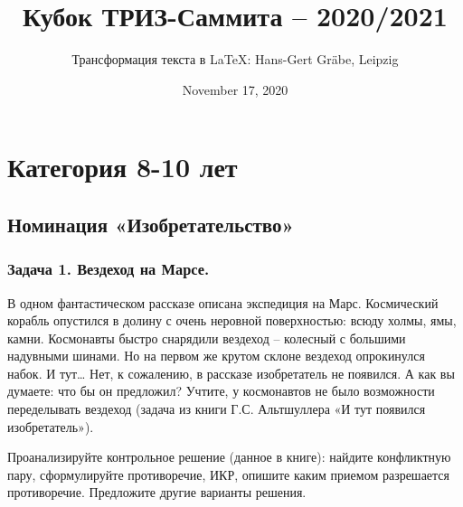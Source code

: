 \documentclass[11pt,a4paper]{article}
\title{Кубок ТРИЗ-Саммита – 2020/2021}
\author{Трансформация текста в \LaTeX: Hans-Gert Gr\"abe, Leipzig}
\date{November 17, 2020}
\begin{document}
\maketitle
\tableofcontents
\enlargethispage{12em}
\clearpage
\section{Категория 8-10 лет}

\subsection{Номинация «Изобретательство»}

\subsubsection*{Задача 1. Вездеход на Марсе.}
В одном фантастическом рассказе описана экспедиция на Марс. Космический
корабль опустился в долину с очень неровной поверхностью: всюду холмы, ямы,
камни. Космонавты быстро снарядили вездеход – колесный с большими надувными
шинами. Но на первом же крутом склоне вездеход опрокинулся набок. И тут… Нет,
к сожалению, в рассказе изобретатель не появился. А как вы думаете: что бы он
предложил? Учтите, у космонавтов не было возможности переделывать вездеход
(задача из книги Г.С. Альтшуллера «И тут появился изобретатель»).

Проанализируйте контрольное решение (данное в книге): найдите конфликтную
пару, сформулируйте противоречие, ИКР, опишите каким приемом разрешается
противоречие. Предложите другие варианты решения.
\end{document}

